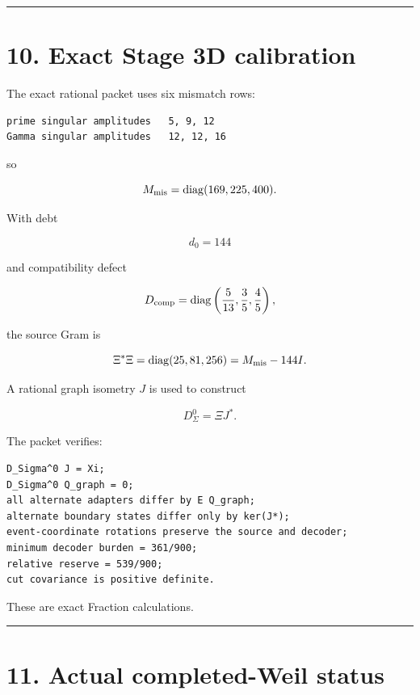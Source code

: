 \begin{center}\rule{0.5\linewidth}{0.5pt}\end{center}

\hypertarget{exact-stage-3d-calibration}{%
\section{10. Exact Stage 3D calibration}\label{exact-stage-3d-calibration}}

The exact rational packet uses six mismatch rows:

\begin{verbatim}
prime singular amplitudes   5, 9, 12
Gamma singular amplitudes   12, 12, 16
\end{verbatim}

so

\[
M_{\rm mis}
=
\operatorname{diag}(169,225,400).
\]

With debt

\[
d_0=144
\]

and compatibility defect

\[
D_{\rm comp}
=
\operatorname{diag}
\left(
\frac5{13},
\frac35,
\frac45
\right),
\]

the source Gram is

\[
\Xi^*\Xi
=
\operatorname{diag}(25,81,256)
=
M_{\rm mis}-144I.
\]

A rational graph isometry \(J\) is used to construct

\[
D_\Sigma^0=\Xi J^*.
\]

The packet verifies:

\begin{verbatim}
D_Sigma^0 J = Xi;
D_Sigma^0 Q_graph = 0;
all alternate adapters differ by E Q_graph;
alternate boundary states differ only by ker(J*);
event-coordinate rotations preserve the source and decoder;
minimum decoder burden = 361/900;
relative reserve = 539/900;
cut covariance is positive definite.
\end{verbatim}

These are exact Fraction calculations.

\begin{center}\rule{0.5\linewidth}{0.5pt}\end{center}

\hypertarget{actual-completed-weil-status}{%
\section{11. Actual completed-Weil status}\label{actual-completed-weil-status}}

